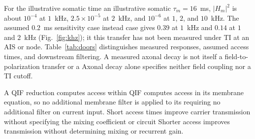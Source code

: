 \documentclass[11pt,a4paper]{article}
\providecommand{\DIFaddtex}[1]{{\protect\color{blue} \sf #1}} %
\providecommand{\DIFdeltex}[1]{{\protect\color{red} \scriptsize #1}} %
\providecommand{\DIFaddbegin}{} %
\providecommand{\DIFaddend}{} %
\providecommand{\DIFdelbegin}{} %
\providecommand{\DIFdelend}{} %
\providecommand{\DIFadd}[1]{\texorpdfstring{\DIFaddtex{#1}}{#1}} %
\providecommand{\DIFdel}[1]{\texorpdfstring{\DIFdeltex{#1}}{}} %
\begin{document}
For \DIFdelbegin \DIFdel{the illustrative somatic time }\DIFdelend \DIFaddbegin \DIFadd{an illustrative somatic }\DIFaddend $\tau_m=16$~ms, $|H_m|^2$ is about
$10^{-4}$\DIFdelbegin \DIFdel{at $1$~kHz}\DIFdelend , $2.5\times10^{-5}$\DIFdelbegin \DIFdel{at $2$~kHz}\DIFdelend , and $10^{-6}$ at \DIFaddbegin \DIFadd{$1$, $2$, and }\DIFaddend $10$~kHz.
The assumed $0.2$~ms \DIFdelbegin \DIFdel{sensitivity case instead }\DIFdelend \DIFaddbegin \DIFadd{case }\DIFaddend gives $0.39$ \DIFdelbegin \DIFdel{at
$1$~kHz }\DIFdelend and $0.14$ at \DIFaddbegin \DIFadd{$1$ and }\DIFaddend $2$~kHz
(Fig.~\ref{fig:khz}); \DIFdelbegin \DIFdel{it }\DIFdelend \DIFaddbegin \DIFadd{this transfer }\DIFaddend has not been measured under TI at an
AIS or node. Table~\ref{tab:doors} distinguishes measured responses,
assumed access\DIFdelbegin \DIFdel{times}\DIFdelend , and downstream filtering. \DIFdelbegin \DIFdel{A measured axonal
decay is not itself a field-to-polarization transfer or a }\DIFdelend \DIFaddbegin \DIFadd{Axonal decay alone specifies
neither field coupling nor a }\DIFaddend TI cutoff.

\DIFdelbegin \DIFdel{A QIF reduction computes access within }\DIFdelend \DIFaddbegin \DIFadd{QIF computes access in }\DIFaddend its membrane equation, \DIFdelbegin \DIFdel{so no additional membrane filter
is applied to its }\DIFdelend \DIFaddbegin \DIFadd{requiring no additional filter
on }\DIFaddend current input. \DIFdelbegin \DIFdel{Short access times improve
carrier transmission without specifying the mixing coefficient or circuit }\DIFdelend \DIFaddbegin \DIFadd{Shorter access improves transmission without determining
mixing or recurrent }\DIFaddend gain.
\end{document}
